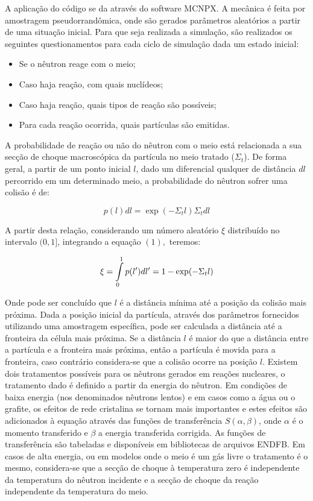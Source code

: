\documentclass[
	12pt,				%
	openany,			%
	twoside,			%
	a4paper,			%
	english,			%
	french,				%
	spanish,			%
	brazil				%
	]{abntex2}
\begin{document}
A aplicação do código se da através do software MCNPX. A mecânica é feita por amostragem pseudorrandômica, onde são gerados parâmetros aleatórios a partir de uma situação inicial. Para que seja realizada a simulação, são realizados os seguintes questionamentos para cada ciclo de simulação dada um estado inicial: 
\begin{itemize}
\item Se o nêutron reage com o meio; 
\item Caso haja reação, com quais nuclídeos; 
\item Caso haja reação, quais tipos de reação são possíveis; 
\item Para cada reação ocorrida, quais partículas são emitidas.
\end{itemize}
A probabilidade de reação ou não do nêutron com o meio está relacionada
a sua secção de choque macroscópica da partícula no meio tratado ($\Sigma_{t}$).
De forma geral, a partir de um ponto inicial $l$, dado um diferencial
qualquer de distância $dl$ percorrido em um determinado meio, a probabilidade
do nêutron sofrer uma colisão é de:

\begin{equation}
p(l)dl=\exp(-\Sigma_{t}l)\Sigma_{t}dl
\end{equation}

A partir desta relação, considerando um número aleatório $\xi$ distribuído
no intervalo $(0,1]$, integrando a equação $(1),$ teremos:

\begin{equation}
\xi=\intop_{0}^{1}p(l')dl'=1-\exp(-\Sigma_{t}l)
\end{equation}

Onde pode ser concluído que $l$ é a distância mínima até a posição da colisão mais próxima. Dada a posição inicial da partícula, através dos parâmetros fornecidos utilizando uma amostragem específica, pode ser calculada a distância até a fronteira da célula mais próxima. Se a distância $l$ é maior do que a distância entre a partícula e a fronteira mais próxima, então a partícula é movida para a fronteira, caso contrário considera-se que a colisão ocorre na posição $l$. Existem dois tratamentos possíveis para os nêutrons gerados em reações nucleares, o tratamento dado é definido a partir da energia do nêutron. Em condições de baixa energia (nos denominados nêutrons lentos) e em casos como a água ou o grafite, os efeitos de rede cristalina se tornam
mais importantes e estes efeitos são adicionados à equação através das funções de transferência $S(\alpha,\beta)$, onde $\alpha$ é o momento transferido e $\beta$ a energia transferida corrigida. As funções de transferência são tabeladas e disponíveis em bibliotecas de arquivos ENDFB. Em casos de alta energia, ou em modelos onde o meio é um gás livre o tratamento é o mesmo, considera-se que a secção de choque à temperatura zero é independente da temperatura do nêutron incidente e a secção de choque da reação independente da temperatura do meio.
\end{document}
